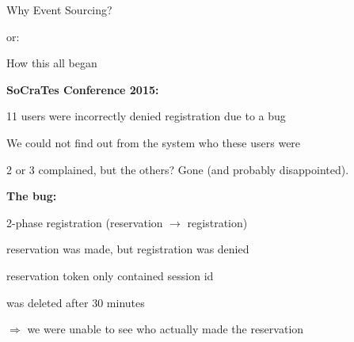 \begin{frame}[fragile]{}

\begin{center}
{
\LARGE
Why Event Sourcing?
}

\vspace{2em}

or:

\vspace{2em}

{
\Large
How this all began
}
\end{center}
\end{frame}

\begin{frame}[fragile]{}

\renewcommand{\SPACE}{1em}

\textbf{SoCraTes Conference 2015:}
\vspace{\SPACE}                 
                
11 users were incorrectly denied registration due to a bug
\vspace{\SPACE}                 
                  
We could not find out from the system who these users were
\vspace{\SPACE}                 
                  
2 or 3 complained, but the others? Gone (and probably disappointed).


\end{frame}

\begin{frame}[fragile]{}

\renewcommand{\SPACE}{1em}

\textbf{The bug:}
\vspace{\SPACE}                 

2-phase registration (reservation $\rightarrow$ registration)
\vspace{\SPACE}                 
                  
reservation was made, but registration was denied
\vspace{\SPACE}                 
                  
reservation token only contained session id

was deleted after 30 minutes
\vspace{\SPACE}                 
                  
$\Longrightarrow$ we were unable to see who actually made the reservation
\vspace{\SPACE}                 
             
\end{frame}

